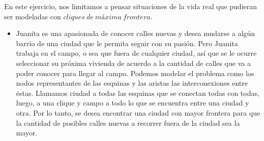En este ejercicio, nos limitamos a pensar situaciones de la vida real que pudieran ser modeladas con $cliques\ de\ máxima\ frontera$.
\begin{itemize}
\item Juanita es una apasionada de conocer calles nuevas y desea mudarse a algún barrio de una ciudad que le permita seguir con su pasión. Pero Juanita trabaja en el campo, o sea que fuera de cualquier ciudad, así que se le ocurre seleccionar su próxima vivienda de acuerdo a la cantidad de calles que va a poder conocer para llegar al campo. Podemos modelar el problema como los nodos representantes de las esquinas y las aristas las interconexiones entre éstas. Llamamos ciudad a todas las esquinas que se conectan todas con todas, luego, a una clique y campo a todo lo que se encuentra entre una ciudad y otra. Por lo tanto, se desea encontrar una ciudad con mayor frontera para que la cantidad de posibles calles nuevas a recorrer fuera de la ciudad sea la mayor.

\end{itemize}
